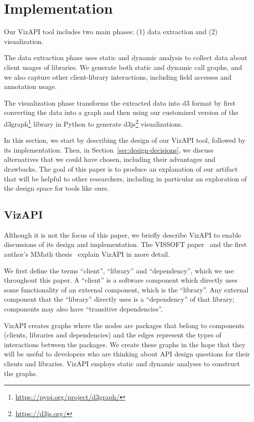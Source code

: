 \section{Implementation}
\label{sec:implementation}
Our VizAPI tool includes two main phases: (1) data extraction and (2)
visualization. 

The data extraction phase uses static and dynamic
analysis to collect data about client usages of libraries. We generate both static and
dynamic call graphs, and we also capture other client-library interactions, including field accesses
and annotation usage. 

The visualization phase transforms the extracted data into d3 format by first converting the data into a graph and then using our customized version
of the d3graph\footnote{\url{https://pypi.org/project/d3graph/}} library in Python to generate d3js\footnote{\url{https://d3js.org/}}
visualizations. 

In this section, we start by describing the design of our VizAPI
tool, followed by its implementation. Then, in Section~\ref{sec:design-decisions}, we discuss
alternatives that we could have chosen, including their advantages and
drawbacks.  The goal of this paper is to produce an explanation of our
artifact that will be helpful to other researchers, including in
particular an exploration of the design space for tools like ours.

\subsection{VizAPI}
Although it is not the focus of this paper, we briefly describe VizAPI
to enable discussions of its design and implementation.
The VISSOFT paper~\cite{venkatanarayanan22:_vizap}
and the first author's MMath thesis~\cite{venkatanarayanan22:_study_lever_api_usage_patter} explain VizAPI in more detail.

We first define the terms ``client'', ``library'' and ``dependency'', which we use throughout this paper. A ``client'' is a software component which directly uses some functionality of an external component, which is the ``library''. Any external component that the ``library'' directly uses is a ``dependency'' of that library; components may also have ``transitive dependencies''.

VizAPI creates graphs where the nodes are packages that belong to components (clients, libraries and dependencies) and the edges represent the types of interactions between the packages. We create these graphs in the hope that they will be useful to developers who are thinking about API design questions for their clients and libraries. VizAPI employs static and dynamic analyses to construct the graphs. 

